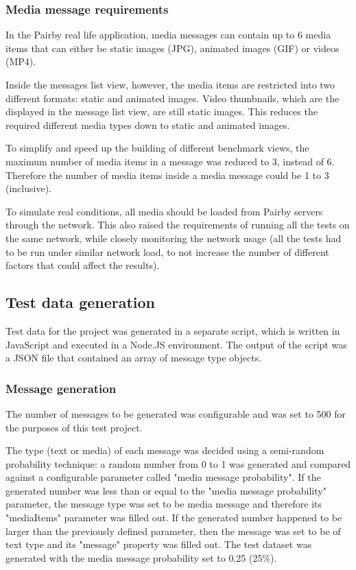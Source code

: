 \documentclass[a4paper,12pt]{article}
\begin{document}
\subsubsection{Media message requirements}
In the Pairby real life application, media messages can contain up to 6 media items that can either be static images (JPG), animated images (GIF) or videos (MP4).

Inside the messages list view, however, the media items are restricted into two different formats: static and animated images. Video thumbnails, which are the displayed in the message list view, are still static images. This reduces the required different media types down to static and animated images.

To simplify and speed up the building of different benchmark views, the maximum number of media items in a message was reduced to 3, instead of 6. Therefore the number of media items inside a media message could be 1 to 3 (inclusive).

To simulate real conditions, all media should be loaded from Pairby servers through the network. This also raised the requirements of running all the tests on the same network, while closely monitoring the network usage (all the tests had to be run under similar network load, to not increase the number of different factors that could affect the results).

\subsection{Test data generation}
Test data for the project was generated in a separate script, which is written in JavaScript and executed in a Node.JS environment. The output of the script was a JSON file that contained an array of message type objects.

\subsubsection{Message generation}
The number of messages to be generated was configurable and was set to 500 for the purposes of this test project.

The type (text or media) of each message was decided using a semi-random probability technique: a random number from 0 to 1 was generated and compared against a configurable parameter called "media message probability". If the generated number was less than or equal to the "media message probability" parameter, the message type was set to be media message and therefore its "mediaItems" parameter was filled out. If the generated number happened to be larger than the previously defined parameter, then the message was set to be of text type and its "message" property was filled out. The test dataset was generated with the media message probability set to 0.25 (25\%).
\end{document}
